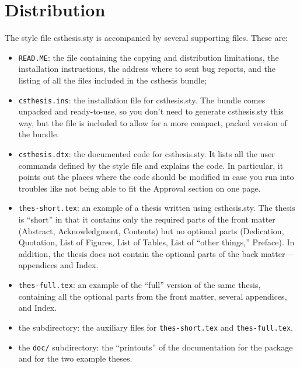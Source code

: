 \section{Distribution}

The style file
\textsf{csthesis.sty} is
accompanied by several supporting files. These
are:

\begin{itemize}
\item \texttt{READ.ME}: the file containing the copying and
  distribution limitations, the installation instructions, the address
  where to sent bug reports, and the listing of all the files included
  in the \textsf{csthesis}%
   bundle;
\item \texttt{csthesis.ins}:
  the installation file for
  \textsf{csthesis.sty}. The
  bundle comes unpacked and ready-to-use, so you don't need to
  generate \textsf{csthesis.sty} this way, but the file is included to
  allow for a more compact, packed version of the bundle.
\item \texttt{csthesis.dtx}:
  the documented code for \textsf{csthesis.sty}. It lists all the user
  commands defined by the style file and explains the code. In
  particular, it points out the places where the code should be
  modified in case you run into troubles like not being able to fit
  the Approval section on one page.
\item
  \texttt{thes-short.tex}:
  an example of a thesis written using \textsf{csthesis.sty}. The
  thesis is ``short'' in that it contains only the required parts of
  the front matter (Abstract, Acknowledgment, Contents) but no
  optional parts (Dedication, Quotation, List
  of Figures, List of Tables, List of ``other things,'' Preface). In
  addition, the thesis does not contain the optional parts of the back
  matter---appendices and Index.
\item
  \texttt{thes-full.tex}:
  an example of the ``full'' version of the same thesis, containing
  all the optional parts from the front
  matter, several appendices, and Index.
\item the \texttt{} subdirectory:
  the auxiliary files for \texttt{thes-short.tex} and
  \texttt{thes-full.tex}.
\item the \texttt{doc/} subdirectory: the
  ``printouts'' of the documentation for the
  package and for the two example theses.
\end{itemize}

